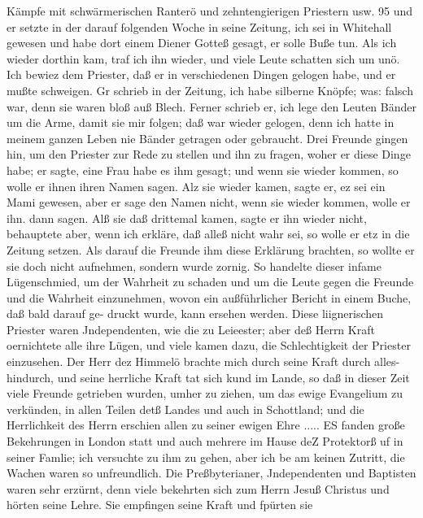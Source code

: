 Kämpfe mit schwärmerischen Ranterö und zehntengierigen Priestern usw. 95
und er setzte in der darauf folgenden Woche in seine Zeitung,
ich sei in Whitehall gewesen und habe dort einem Diener Gotteß
gesagt, er solle Buße tun. Als ich wieder dorthin kam, traf ich
ihn wieder, und viele Leute schatten sich um unö. Ich bewiez
dem Priester, daß er in verschiedenen Dingen gelogen habe, und
er mußte schweigen. Gr schrieb in der Zeitung, ich habe silberne
Knöpfe; was: falsch war, denn sie waren bloß auß Blech. Ferner
schrieb er, ich lege den Leuten Bänder um die Arme, damit sie
mir folgen; daß war wieder gelogen, denn ich hatte in meinem
ganzen Leben nie Bänder getragen oder gebraucht. Drei Freunde
gingen hin, um den Priester zur Rede zu stellen und ihn zu
fragen, woher er diese Dinge habe; er sagte, eine Frau habe es
ihm gesagt; und wenn sie wieder kommen, so wolle er ihnen ihren
Namen sagen. Alz sie wieder kamen, sagte er, ez sei ein Mami
gewesen, aber er sage den Namen nicht, wenn sie wieder kommen,
wolle er ihn. dann sagen. Alß sie daß drittemal kamen, sagte
er ihn wieder nicht, behauptete aber, wenn ich erkläre, daß alleß
nicht wahr sei, so wolle er etz in die Zeitung setzen. Als darauf
die Freunde ihm diese Erklärung brachten, so wollte er sie doch
nicht aufnehmen, sondern wurde zornig. So handelte dieser
infame Lügenschmied, um der Wahrheit zu schaden und um die
Leute gegen die Freunde und die Wahrheit einzunehmen, wovon
ein außführlicher Bericht in einem Buche, daß bald darauf ge-
druckt wurde, kann ersehen werden. Diese liignerischen Priester
waren Jndependenten, wie die zu Leieester; aber deß Herrn
Kraft oernichtete alle ihre Lügen, und viele kamen dazu, die
Schlechtigkeit der Priester einzusehen. Der Herr dez Himmelö
brachte mich durch seine Kraft durch alles- hindurch, und seine
herrliche Kraft tat sich kund im Lande, so daß in dieser Zeit
viele Freunde getrieben wurden, umher zu ziehen, um das ewige
Evangelium zu verkünden, in allen Teilen detß Landes und auch
in Schottland; und die Herrlichkeit des Herrn erschien allen zu
seiner ewigen Ehre ..... ES fanden große Bekehrungen in
London statt und auch mehrere im Hause deZ Protektorß uf in
seiner Famlie; ich versuchte zu ihm zu gehen, aber ich be am
keinen Zutritt, die Wachen waren so unfreundlich.
Die Preßbyterianer, Jndependenten und Baptisten waren sehr
erzürnt, denn viele bekehrten sich zum Herrn Jesuß Christus und
hörten seine Lehre. Sie empfingen seine Kraft und fpürten sie


